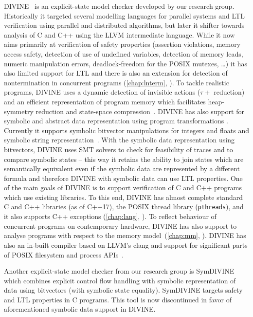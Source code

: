 DIVINE~\cite{DIVINEToolPaper2017} is an explicit-state model checker developed
by our research group.
Historically it targeted several modelling languages for parallel systems and
LTL verification using parallel and distributed algorithms, but later it
shifter towards analysis of C and C++ using the LLVM intermediate language.
While it now aims primarily at verification of safety properties (assertion
violations, memory access safety, detection of use of undefined variables,
detection of memory leads, numeric manipulation errors, deadlock-freedom for
the POSIX mutexes, …) it has also limited support for LTL and there is also an
extension for detection of nontermination in concurrent programs
(\autoref{chap:lnterm}, \cite{SB2019}).
To tackle realistic programs, DIVINE uses a dynamic detection of invisible
actions ($\tau+$ reduction) and an efficient representation of program memory
which facilitates heap-symmetry reduction and state-space
compression~\cite{RSCB2018}.
DIVINE has also support for symbolic and abstract data representation using
program transformations \cite{LRB2018}.
Currently it supports symbolic bitvector manipulations for integers and floats
and symbolic string representation~\cite{CLR2019}.
With the symbolic data representation using bitvectors, DIVINE uses SMT solvers
to check for feasibility of traces and to compare symbolic states -- this way
it retains the ability to join states which are semantically equivalent even if
the symbolic data are represented by a different formula and therefore DIVINE
with symbolic data can use LTL properties.
One of the main goals of DIVINE is to support verification of C and C++
programs which use existing libraries.
To this end, DIVINE has almost complete standard C and C++ libraries (as of
C++17), the POSIX thread library (\texttt{pthreads}), and it also supports C++
exceptions (\autoref{chap:lang}, \cite{SRB2017}).
To reflect behaviour of concurrent programs on contemporary hardware, DIVINE
has also support to analyse programs with respect to the \xtso memory
model~(\autoref{chap:mm}, \cite{SB2018x86tso}).
DIVINE has also an in-built compiler based on LLVM's clang and support for significant parts of POSIX filesystem and process APIs~\cite{RBMKB2019}.

Another explicit-state model checker from our research group is
\textsf{SymDIVINE}~\cite{MBLB2016} which combines explicit control flow
handling with symbolic representation of data using bitvectors (with symbolic
state equality).
\textsf{SymDIVINE} targets safety and LTL properties in C programs.
This tool is now discontinued in favor of aforementioned symbolic data support
in DIVINE.


